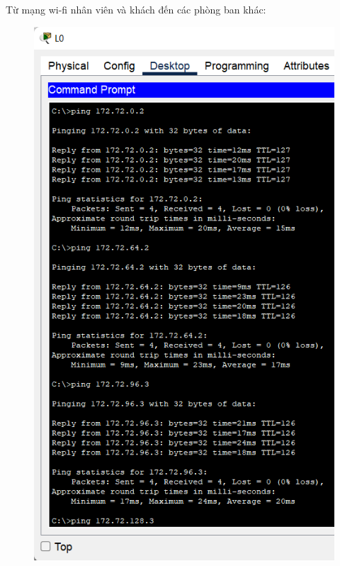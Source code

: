 \begin{enumerate}
\begin{enumerate}
Từ mạng wi-fi nhân viên và khách đến các phòng ban khác:
\begin{figure}[H]
\begin{center}
\includegraphics[scale=.5]{../figures/p2/test-ping-3}

\end{center}
\end{figure}
\end{enumerate}
\end{enumerate}

